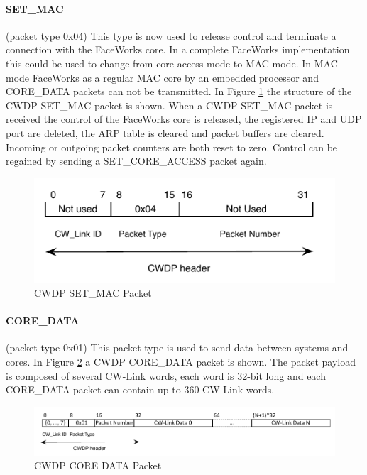 \documentclass[defaultstyle,10pt,master,Helvetica]{thesis}
\begin{document}
\paragraph*{SET\_MAC} (packet type 0x04) This type is now used to release control and terminate a connection with the FaceWorks core. In a complete FaceWorks implementation this could be used to change from core access mode to \ac{MAC} mode. In \ac{MAC} mode FaceWorks as a regular MAC core by an embedded processor and CORE\_DATA packets can not be transmitted.  In Figure \ref{fig:mac-access} the structure of the \ac{CWDP} SET\_MAC packet is shown. When a \ac{CWDP} SET\_MAC packet is received the control of the FaceWorks core is released, the registered \ac{IP} and \ac{UDP} port are deleted, the \ac{ARP} table is cleared and packet buffers are cleared. Incoming or outgoing packet counters are both reset to zero. Control can be regained by sending a SET\_CORE\_ACCESS packet again.

\begin{figure}[h]
  \centering
      \includegraphics[scale=1]{Diagrams/CWDP-Set-MAC.pdf}
  \caption{\ac{CWDP} SET\_MAC Packet}
  \label{fig:mac-access}
\end{figure}

\paragraph*{CORE\_DATA} (packet type 0x01) This packet type is used to send data between systems and cores. In Figure \ref{fig:cwdp-data} a \ac{CWDP} CORE\_DATA packet is shown. The packet payload is composed of several CW-Link words, each word is 32-bit long and each CORE\_DATA packet can contain up to 360 CW-Link words.

\begin{figure}[h]
  \centering
      \includegraphics[scale=1,center]{Diagrams/CWDP_Core_data_paper.pdf}
  \caption{\ac{CWDP} CORE DATA Packet}
  \label{fig:cwdp-data}
\end{figure}
\end{document}
